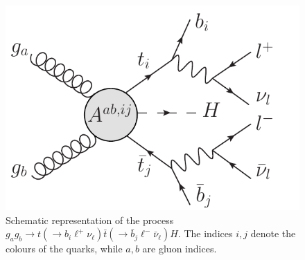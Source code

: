 \documentclass[aps,preprint,tightenlines,floatfix,superscriptaddress,nofootinbib,showpacs]{revtex4-1}
\def\tbar{\bar{t}}
\def\bbar{\bar{b}}
\def\nubar{{\bar{\nu}}_{\ell}}
\begin{document}
\begin{center}
\begin{figure}[H]
\centering
\includegraphics[scale=0.6]{esquematico_II.pdf}
\vspace*{0.02\textwidth}
\caption{Schematic representation of the process $g_ag_b\to t(\to
  b_i{\ell}^+\nu_{\ell})\tbar(\to \bbar_j {\ell}^- \nubar) H$. The
  indices $i,j$ denote the colours of the quarks, while $a,b$ are gluon
  indices.}
\label{fig2}
\end{figure}
\end{center}
\end{document}
